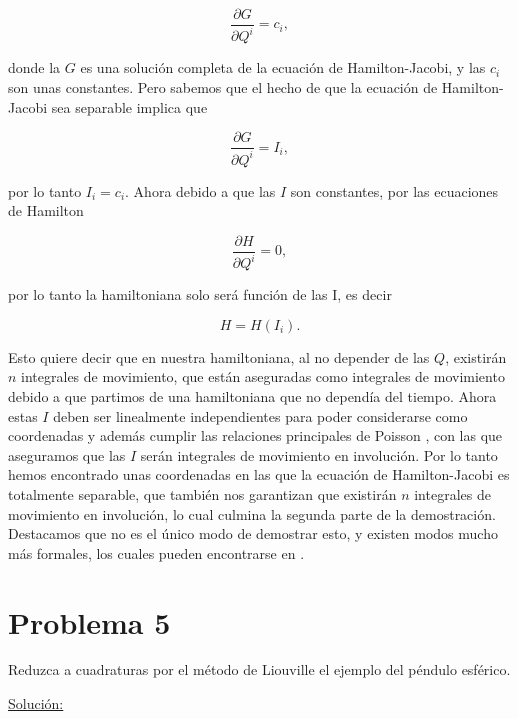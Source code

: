 \documentclass[a4paper,10pt]{article}
\numberwithin{equation}{section}
\begin{document}
\begin{equation}
 \frac{\partial G}{\partial Q^i} = c_i, 
\end{equation}

donde la $G$ es una solución completa de la ecuación de Hamilton-Jacobi, y las 
$c_i$ son unas constantes. Pero sabemos que el hecho de que la ecuación de Hamilton-
Jacobi sea separable implica que 

\begin{equation}
 \frac{\partial G}{\partial Q^i} = I_i,
\end{equation}

por lo tanto $I_i = c_i$. Ahora debido a que las $I$ son constantes, por las ecuaciones 
de Hamilton 

\begin{equation}
 \frac{\partial H}{\partial Q^i} = 0,
\end{equation}

por lo tanto la hamiltoniana solo será función de las I, es decir 

\begin{equation}
 H = H(I_i).
\end{equation}

Esto quiere decir que en nuestra hamiltoniana, al no depender de las $Q$, existirán 
$n$ integrales de movimiento, que están aseguradas como integrales de movimiento debido 
a que partimos de una hamiltoniana que no dependía del tiempo. Ahora estas $I$ deben 
ser linealmente independientes para poder considerarse como coordenadas y además cumplir 
las relaciones principales de Poisson \cite{abraham}, con las que aseguramos que las $I$ serán integrales 
de movimiento en involución. Por lo tanto hemos encontrado unas coordenadas en las que la ecuación 
de Hamilton-Jacobi es totalmente separable, que también nos garantizan que existirán
$n$ integrales de movimiento en involución, lo cual culmina la segunda parte de la 
demostración. Destacamos que no es el único modo de demostrar esto, y existen modos 
mucho más formales, los cuales pueden encontrarse en \cite{abraham}.

\section{Problema 5}


Reduzca a cuadraturas por el método de Liouville el ejemplo del péndulo esférico.

\vspace{.3cm}

\underline{Solución:} \vspace{.3cm}
\end{document}
